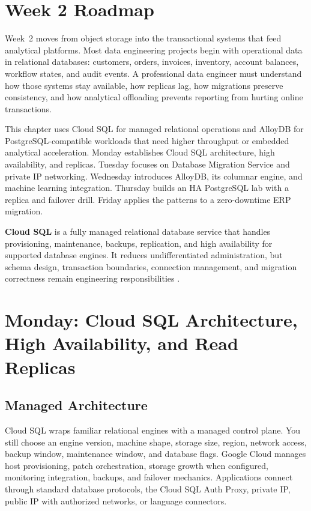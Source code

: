 \section{Week 2 Roadmap}
Week~2 moves from object storage into the transactional systems that feed analytical platforms. Most data engineering projects begin with operational data in relational databases: customers, orders, invoices, inventory, account balances, workflow states, and audit events. A professional data engineer must understand how those systems stay available, how replicas lag, how migrations preserve consistency, and how analytical offloading prevents reporting from hurting online transactions.

This chapter uses Cloud SQL for managed relational operations and AlloyDB for PostgreSQL-compatible workloads that need higher throughput or embedded analytical acceleration. Monday establishes Cloud SQL architecture, high availability, and replicas. Tuesday focuses on Database Migration Service and private IP networking. Wednesday introduces AlloyDB, its columnar engine, and machine learning integration. Thursday builds an HA PostgreSQL lab with a replica and failover drill. Friday applies the patterns to a zero-downtime ERP migration.

\begin{definitionbox}
\textbf{Cloud SQL} is a fully managed relational database service that handles provisioning, maintenance, backups, replication, and high availability for supported database engines. It reduces undifferentiated administration, but schema design, transaction boundaries, connection management, and migration correctness remain engineering responsibilities \cite{googlecloudsqldocs}.
\end{definitionbox}

\section{Monday: Cloud SQL Architecture, High Availability, and Read Replicas}

\subsection{Managed Architecture}
Cloud SQL wraps familiar relational engines with a managed control plane. You still choose an engine version, machine shape, storage size, region, network access, backup window, maintenance window, and database flags. Google Cloud manages host provisioning, patch orchestration, storage growth when configured, monitoring integration, backups, and failover mechanics. Applications connect through standard database protocols, the Cloud SQL Auth Proxy, private IP, public IP with authorized networks, or language connectors.

